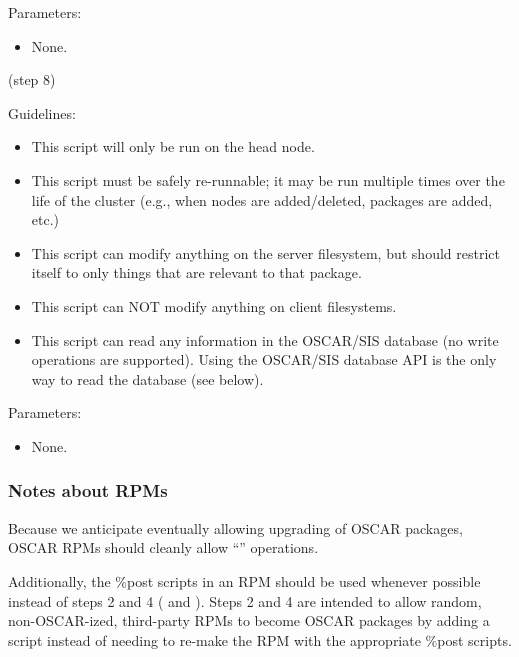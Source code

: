 \begin{itemize}
  Parameters:

  \begin{itemize}
  \item None.
  \end{itemize}
  
   (step 8)

  Guidelines:
  
  \begin{itemize}
  \item This script will only be run on the head node.
  \item This script must be safely re-runnable; it may be run multiple
    times over the life of the cluster (e.g., when nodes are
    added/deleted, packages are added, etc.)
  \item This script can modify anything on the server filesystem, but
    should restrict itself to only things that are relevant to that
    package.
  \item This script can NOT modify anything on client filesystems.
  \item This script can read any information in the OSCAR/SIS database
    (no write operations are supported).  Using the OSCAR/SIS database
    API is the only way to read the database (see below).
  \end{itemize}

  Parameters:
  
  \begin{itemize}
  \item None.
  \end{itemize}
\end{itemize}


\subsubsection{Notes about RPMs}

Because we anticipate eventually allowing upgrading of OSCAR packages,
OSCAR RPMs should cleanly allow ``'' operations.

Additionally, the \%post scripts in an RPM should be used whenever
possible instead of steps 2 and 4
( and
).  Steps 2 and 4 are intended
to allow random, non-OSCAR-ized, third-party RPMs to become OSCAR
packages by adding a script instead of needing to re-make the RPM with
the appropriate \%post scripts.

